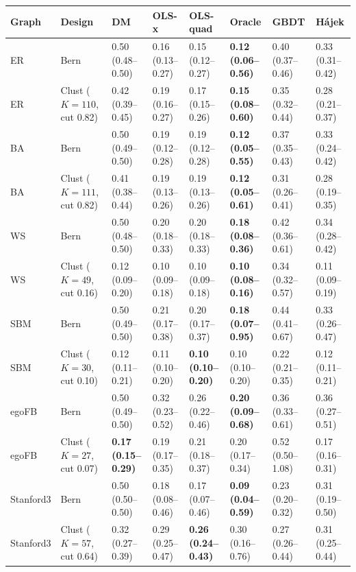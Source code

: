 \begin{tabular}{llllllll}
\toprule
Graph & Design & DM & OLS-x & OLS-quad & Oracle & GBDT & H\'ajek \\
\midrule
ER & Bern & 0.50 (0.48--0.50) & 0.16 (0.13--0.27) & 0.15 (0.12--0.27) & \textbf{0.12 (0.06--0.56)} & 0.40 (0.37--0.46) & 0.33 (0.31--0.42) \\
ER & Clust ($K{=}110$, cut 0.82) & 0.42 (0.39--0.45) & 0.19 (0.16--0.27) & 0.17 (0.15--0.26) & \textbf{0.15 (0.08--0.60)} & 0.35 (0.32--0.44) & 0.28 (0.21--0.37) \\
\midrule
BA & Bern & 0.50 (0.49--0.50) & 0.19 (0.12--0.28) & 0.19 (0.12--0.28) & \textbf{0.12 (0.05--0.55)} & 0.37 (0.35--0.43) & 0.33 (0.24--0.42) \\
BA & Clust ($K{=}111$, cut 0.82) & 0.41 (0.38--0.44) & 0.19 (0.13--0.26) & 0.19 (0.13--0.26) & \textbf{0.12 (0.05--0.61)} & 0.31 (0.26--0.41) & 0.28 (0.19--0.35) \\
\midrule
WS & Bern & 0.50 (0.48--0.50) & 0.20 (0.18--0.33) & 0.20 (0.18--0.33) & \textbf{0.18 (0.08--0.36)} & 0.42 (0.36--0.61) & 0.34 (0.28--0.42) \\
WS & Clust ($K{=}49$, cut 0.16) & 0.12 (0.09--0.20) & 0.10 (0.09--0.18) & 0.10 (0.09--0.18) & \textbf{0.10 (0.08--0.16)} & 0.34 (0.32--0.57) & 0.11 (0.09--0.19) \\
\midrule
SBM & Bern & 0.50 (0.49--0.50) & 0.21 (0.17--0.38) & 0.20 (0.17--0.37) & \textbf{0.18 (0.07--0.95)} & 0.44 (0.41--0.67) & 0.33 (0.26--0.47) \\
SBM & Clust ($K{=}30$, cut 0.10) & 0.12 (0.11--0.21) & 0.11 (0.10--0.20) & \textbf{0.10 (0.10--0.20)} & 0.10 (0.10--0.20) & 0.22 (0.21--0.35) & 0.12 (0.11--0.21) \\
\midrule
egoFB & Bern & 0.50 (0.49--0.50) & 0.32 (0.23--0.52) & 0.26 (0.22--0.46) & \textbf{0.20 (0.09--0.68)} & 0.36 (0.33--0.61) & 0.36 (0.27--0.51) \\
egoFB & Clust ($K{=}27$, cut 0.07) & \textbf{0.17 (0.15--0.29)} & 0.19 (0.17--0.35) & 0.21 (0.18--0.37) & 0.20 (0.17--0.34) & 0.52 (0.50--1.08) & 0.17 (0.16--0.31) \\
\midrule
Stanford3 & Bern & 0.50 (0.50--0.50) & 0.18 (0.08--0.46) & 0.17 (0.07--0.46) & \textbf{0.09 (0.04--0.59)} & 0.23 (0.20--0.32) & 0.31 (0.19--0.50) \\
Stanford3 & Clust ($K{=}57$, cut 0.64) & 0.32 (0.27--0.39) & 0.29 (0.25--0.47) & \textbf{0.26 (0.24--0.43)} & 0.30 (0.16--0.76) & 0.27 (0.26--0.44) & 0.31 (0.25--0.44) \\
\bottomrule
\end{tabular}
